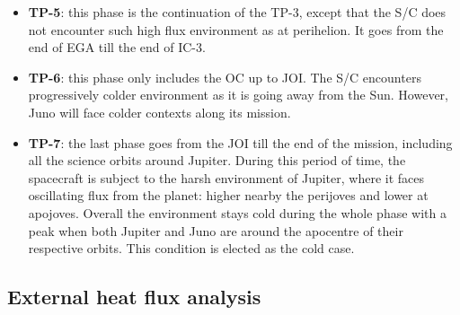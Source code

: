 \begin{itemize}
    \item \textbf{TP-5}:
    this phase is the continuation of the TP-3, except that the S/C does not encounter such high flux environment as at perihelion. It goes from the end of EGA till the end of IC-3.
    
    \item \textbf{TP-6}:
    this phase only includes the OC up to JOI. The S/C encounters progressively colder environment as it is going away from the Sun. However, Juno will face colder contexts along its mission.

    
    \item \textbf{TP-7}:
    the last phase goes from the JOI till the end of the mission, including all the science orbits around Jupiter.
    During this period of time, the spacecraft is subject to the harsh environment of Jupiter, where it faces oscillating flux from the planet: higher nearby the perijoves and lower at apojoves.
    Overall the environment stays cold during the whole phase with a peak when both Jupiter and Juno are around the apocentre of their respective orbits. This condition is elected as the cold case.
    
\end{itemize}

\subsection{External heat flux analysis}
\label{subsec:heat_flux_analysis}

